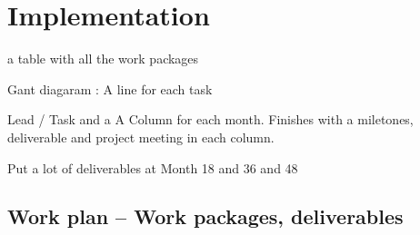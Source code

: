 \chapter{Implementation}\label{chap:implementation}

{\color{red} a table with all the work packages}

Gant diagaram : A line for each task

Lead / Task and a A Column for each month. Finishes with a
miletones, deliverable and project meeting in each column.

Put a lot of deliverables at Month 18 and 36 and 48




\section{Work plan -- Work packages, deliverables}

